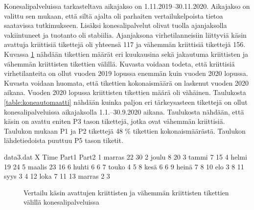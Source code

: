 Konesalipalveluissa tarkasteltava aikajakso on 1.11.2019--30.11.2020. Aikajakso on valittu sen mukaan, että siltä ajalta oli parhaiten vertailukelpoista tietoa saatavissa tutkimukseen. Lisäksi konesalipalvelut olivat tuolla ajanjaksolla vakiintuneet ja tuotanto oli stabiilia. Ajanjaksona virhetilanneisiin liittyviä käsin avattuja kriittisiä tikettejä oli yhteensä 117 ja vähemmän kriittisiä tikettejä 156. Kuvassa \ref{fig:konesalitiketit} nähdään tikettien määrät eri kuukausina sekä jakautuma kriittisten ja vähemmän kriittisten tikettien välillä. Kuvasta voidaan todeta, että kriittisiä virhetilanteita on ollut vuoden 2019 lopussa enemmän kuin vuoden 2020 lopussa. Kuvasta voidaan huomata, että tikettien kokonaismäärä on laskenut vuoden 2020 aikana. Vuoden 2020 lopussa kriittisten tikettien määrä oli vähäinen. Taulukosta \ref{table:koneautomaatti} nähdään kuinka paljon eri tärkeysasteen tikettejä on ollut konesalipalveluissa aikajaksolla 1.1.--30.9.2020 aikana. Taulukosta nähdään, että käsin on avattu eniten P3 tason tikettejä, jotka ovat vähemmän kriittisiä. Taulukon mukaan P1 ja P2 tikettejä 48 \% tikettien kokonaismäärästä. Taulukon lähdetiedoista puuttuu P5 tason tiketit.

\begin{filecontents}{data3.dat}
X Time  	Part1  Part2
1 marras  	22	    30
2 joulu		8	    20
3 tammi 	7	    15
4 helmi		19	    24
5 maalis	23	    16
6 huhti		6	    6
7 touko		4	    5
8 kesä      6       6
9 heinä     7       8
10 elo      3       8
11 syys     3       4
12 loka     7       11
13 marras   2       3
\end{filecontents}

\begin{figure}[ht]
\caption{Vertailu käsin avattujen kriittisten ja vähemmän kriittisten tikettien välillä konesalipalveluissa}
\label{fig:konesalitiketit}
\end{figure}

